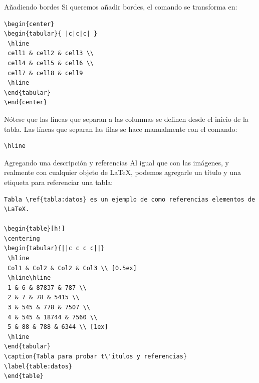 \documentclass[11pt]{beamer}
\begin{document}
\begin{frame}[containsverbatim]{A\~nadiendo bordes}
			Si queremos a\~nadir bordes, el comando se transforma en:
			\begin{lstlisting}[basicstyle=\small]
\begin{center}
\begin{tabular}{ |c|c|c| } 
 \hline
 cell1 & cell2 & cell3 \\ 
 cell4 & cell5 & cell6 \\ 
 cell7 & cell8 & cell9
 \hline
\end{tabular}
\end{center}
			\end{lstlisting}
Nótese que las líneas que separan a las columnas se definen desde el inicio de la 
tabla. Las líneas que separan las filas se hace manualmente con el comando:
\begin{lstlisting}
\hline
\end{lstlisting}
\end{frame}
\begin{frame}[containsverbatim]{Agregando una descripción y referencias}
			Al igual que con las imágenes, y realmente con cualquier objeto de \LaTeX, podemos agregarle un t\'itulo y una etiqueta para referenciar una tabla:
			\begin{lstlisting}[basicstyle=\tiny]
Tabla \ref{tabla:datos} es un ejemplo de como referencias elementos de \LaTeX.
 
\begin{table}[h!]
\centering
\begin{tabular}{||c c c c||} 
 \hline
 Col1 & Col2 & Col2 & Col3 \\ [0.5ex] 
 \hline\hline
 1 & 6 & 87837 & 787 \\ 
 2 & 7 & 78 & 5415 \\
 3 & 545 & 778 & 7507 \\
 4 & 545 & 18744 & 7560 \\
 5 & 88 & 788 & 6344 \\ [1ex] 
 \hline
\end{tabular}
\caption{Tabla para probar t\'itulos y referencias}
\label{table:datos}
\end{table}
			\end{lstlisting}
\end{frame}
\end{document}
